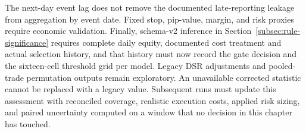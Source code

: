 The next-day event lag does not remove the documented late-reporting leakage from aggregation by event date. Fixed stop, pip-value, margin, and risk proxies require economic validation. Finally, schema-v2 inference in Section~\ref{subsec:rule-significance} requires complete daily equity, documented cost treatment and actual selection history, and that history must now record the gate decision and the sixteen-cell threshold grid per model. Legacy DSR adjustments and pooled-trade permutation outputs remain exploratory. An unavailable corrected statistic cannot be replaced with a legacy value. Subsequent runs must update this assessment with reconciled coverage, realistic execution costs, applied risk sizing, and paired uncertainty computed on a window that no decision in this chapter has touched.
